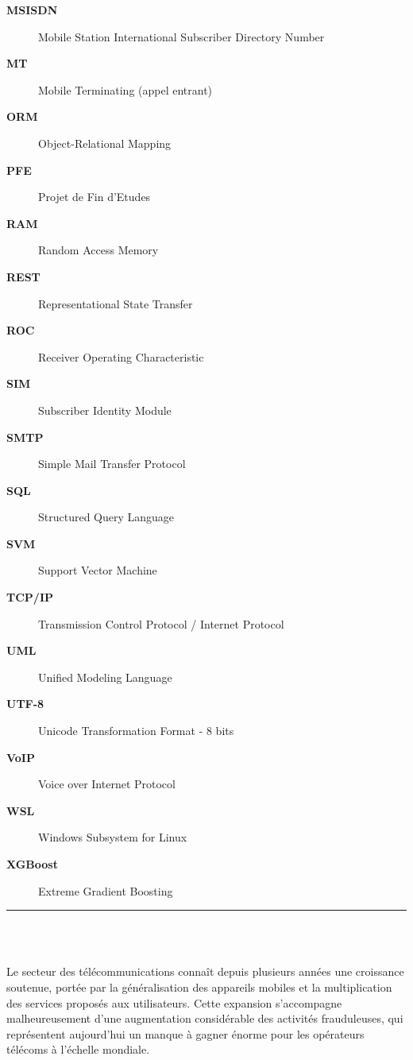 \documentclass[12pt, oneside, a4paper]{report}
\begin{document}
\begin{description}
\item[\textbf{MSISDN}] Mobile Station International Subscriber Directory Number
\item[\textbf{MT}] Mobile Terminating (appel entrant)
\item[\textbf{ORM}] Object-Relational Mapping
\item[\textbf{PFE}] Projet de Fin d'Etudes
\item[\textbf{RAM}] Random Access Memory
\item[\textbf{REST}] Representational State Transfer
\item[\textbf{ROC}] Receiver Operating Characteristic
\item[\textbf{SIM}] Subscriber Identity Module
\item[\textbf{SMTP}] Simple Mail Transfer Protocol
\item[\textbf{SQL}] Structured Query Language
\item[\textbf{SVM}] Support Vector Machine
\item[\textbf{TCP/IP}] Transmission Control Protocol / Internet Protocol
\item[\textbf{UML}] Unified Modeling Language
\item[\textbf{UTF-8}] Unicode Transformation Format - 8 bits
\item[\textbf{VoIP}] Voice over Internet Protocol
\item[\textbf{WSL}] Windows Subsystem for Linux
\item[\textbf{XGBoost}] Extreme Gradient Boosting
\end{description}
\clearpage
\thispagestyle{plain}

\noindent\rule[-0.2cm]{0.45cm}{1.2cm}\hspace{0.15cm}%
\raisebox{0.85cm}{\rule{0.85\textwidth}{0.5pt}}\\[0.3cm]
\noindent{}\\
\vspace{1cm}


Le secteur des télécommunications connaît depuis plusieurs années une croissance soutenue, portée par la généralisation des appareils mobiles et la multiplication des services proposés aux utilisateurs. Cette expansion s'accompagne malheureusement d'une augmentation considérable des activités frauduleuses, qui représentent aujourd'hui un manque à gagner énorme pour les opérateurs télécoms à l'échelle mondiale.
\end{document}
